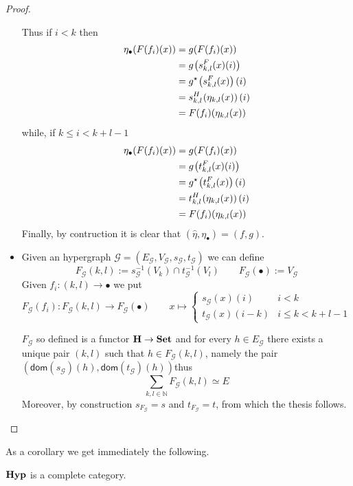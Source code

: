 \documentclass[runningheads,envcountsect]{llncs}
\newcommand{\catname}[1]{\textbf{\textup{#1}}}
\newcommand{\hyp}{\catname{Hyp}}
\newcommand{\dom}{\mathsf{dom}}
\begin{document}
\begin{proof}
\begin{itemize}
		Thus if $i<k$ then
		\begin{align*}
			\eta_\bullet(F(f_i)(x))&=g(F(f_i)(x))\\&=g\hspace{-1pt}\left(s^F_{k,l}(x)(i)\right)\\&=g^\star\hspace{-1pt}\left(s^F_{k,l}(x)\right)(i)\\&=s^H_{k,l}\hspace{-1pt}\left(\eta_{k,l}(x)\right)(i)\\&=F(f_i)(\eta_{k,l}(x))
		\end{align*}
		while, if $k\leq i < k+l-1$
		\begin{align*}
			\eta_\bullet(F(f_i)(x))&=g(F(f_i)(x))\\&=g\hspace{-1pt}\left(t^F_{k,l}(x)(i)\right)\\&=g^\star\hspace{-1pt}\left(t^F_{k,l}(x)\right)(i)\\&=t^H_{k,l}\hspace{-1pt}\left(\eta_{k,l}(x)\right)(i)\\&=F(f_i)(\eta_{k,l}(x))
		\end{align*}
		Finally, by contruction it is clear that $(\hat{\eta}, \eta_{\bullet})=(f,g)$. 
		\item Given an hypergraph $\mathcal{G}=(E_\mathcal{G}, V_\mathcal{G}, s_\mathcal{G}, t_\mathcal{G})$ we can define 
		\[F_{\mathcal{G}}(k,l):=s_\mathcal{G}^{-1}(V_k)\cap t_\mathcal{G}^{-1}(V_l) \qquad F_{\mathcal{G}}(\bullet):=V_\mathcal{G}\]
		Given $f_i\colon (k,l)\to \bullet$ we put
		\[F_{\mathcal{G}}(f_i)\colon F_{\mathcal{G}}(k,l)\to F_{\mathcal{G}}(\bullet) \qquad x\mapsto \begin{cases}
			s_\mathcal{G}(x)(i) & i<k\\
			t_\mathcal{G}(x) (i-k) &i\leq k < k+l-1
		\end{cases}  \]
		
		$F_{\mathcal{G}}$ so defined is a functor $\catname{H}\to \catname{Set}$ and for every $h\in E_\mathcal{G}$ there exists a unique pair $(k,l)$ such that $h\in F_{\mathcal{G}}(k,l) $, namely the pair $(\dom(s_\mathcal{G})(h), \dom(t_\mathcal{G})(h))$thus
		\[\sum_{k,l\in \mathbb{N}}F_{\mathcal{G}}(k,l)\simeq E\]
		Moreover, by construction $s_{F_{\mathcal{G}}}=s$ and $t_{F_{\mathcal{G}}}=t$, from which the thesis follows. 
	\end{itemize}
\end{proof}
As a corollary we get immediately the following.
\begin{corollary}
	$\hyp$ is a complete category.
\end{corollary}
\end{document}
